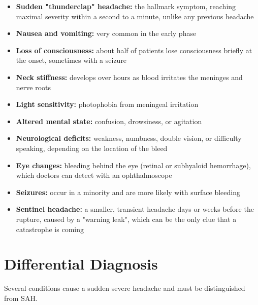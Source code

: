 \begin{itemize}
    \item \textbf{Sudden "thunderclap" headache:} the hallmark symptom, reaching maximal severity within a second to a minute, unlike any previous headache
    \item \textbf{Nausea and vomiting:} very common in the early phase
    \item \textbf{Loss of consciousness:} about half of patients lose consciousness briefly at the onset, sometimes with a seizure
    \item \textbf{Neck stiffness:} develops over hours as blood irritates the meninges and nerve roots
    \item \textbf{Light sensitivity:} photophobia from meningeal irritation
    \item \textbf{Altered mental state:} confusion, drowsiness, or agitation
    \item \textbf{Neurological deficits:} weakness, numbness, double vision, or difficulty speaking, depending on the location of the bleed
    \item \textbf{Eye changes:} bleeding behind the eye (retinal or subhyaloid hemorrhage), which doctors can detect with an ophthalmoscope
    \item \textbf{Seizures:} occur in a minority and are more likely with surface bleeding
    \item \textbf{Sentinel headache:} a smaller, transient headache days or weeks before the rupture, caused by a "warning leak", which can be the only clue that a catastrophe is coming
\end{itemize}

\section*{Differential Diagnosis}
Several conditions cause a sudden severe headache and must be distinguished from SAH.

